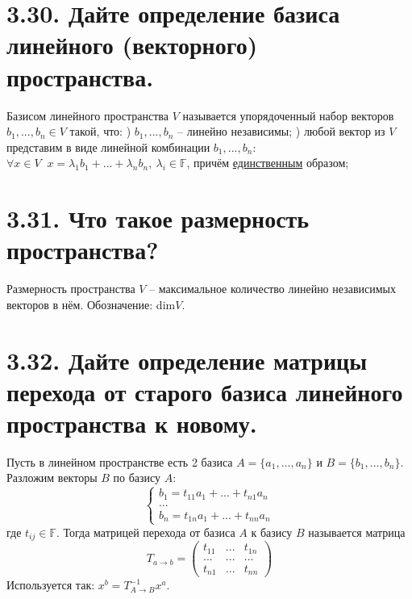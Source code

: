 \documentclass{article}
\begin{document}
\section*{\LARGE 3.30. Дайте определение базиса линейного (векторного) пространства. }
Базисом линейного пространства $V$ называется упорядоченный набор векторов $b_1, ..., b_n \in V$ такой, что:
\newline {}) $b_1, ..., b_n$ -- линейно независимы;
\newline {}) любой вектор из $V$ представим в виде линейной комбинации $b_1, ..., b_n$:
\newline\indent $\forall x \in V \;\; x = \lambda_1b_1 + ... + \lambda_nb_n,\: \lambda_i \in \mathbb{F}$, причём \underline{единственным} образом;

\section*{\LARGE 3.31. Что такое размерность пространства? }
Размерность пространства $V$ -- максимальное количество линейно независимых векторов в нём. Обозначение: dim$V$.

\section*{\LARGE 3.32. Дайте определение матрицы перехода от старого базиса линейного пространства к новому. }
Пусть в линейном пространстве есть 2 базиса $A = \{a_1, ..., a_n\}$ и $B = \{b_1, ..., b_n\}$. Разложим векторы $B$ по базису $A$:
$$
\begin{cases}
b_1 = t_{11}a_1 + ... + t_{n1}a_n \\
... \\
b_n = t_{1n}a_1 + ... + t_{nn}a_n
\end{cases}
$$
где $t_{ij} \in \mathbb{F}$. Тогда матрицей перехода от базиса $A$ к базису $B$ называется матрица 
$$
T_{a \rightarrow b} = 
\begin{pmatrix}
t_{11} & ... & t_{1n} \\
... & ... & ... \\
t_{n1} & ... & t_{nn}
\end{pmatrix}
$$
Используется так: $x^b = T_{A \rightarrow B}^{-1} x^a$.
\end{document}
